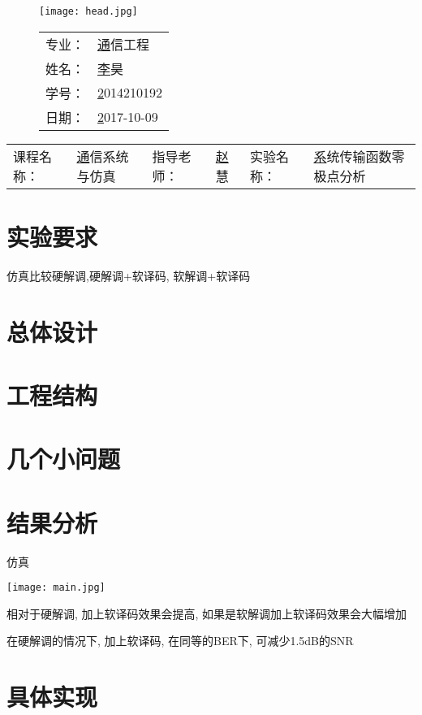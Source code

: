 \documentclass{zjureport}
\newcommand{\major}{通信工程}
\newcommand{\name}{李昊}
\newcommand{\stuid}{2014210192}
\newcommand{\newdate}{2017-10-09}
\newcommand{\course}{通信系统与仿真}
\newcommand{\tutor}{赵慧}
\newcommand{\newtitle}{系统传输函数零极点分析}
\begin{document}
\thispagestyle{empty}
\begin{figure}[h]
  \begin{minipage}{0.6\linewidth}
    \centerline{\texttt{[image: head.jpg]}}
  \end{minipage}
  \hfill
  \begin{minipage}{.4\linewidth}
    \raggedleft
    \begin{tabular*}{.8\linewidth}{ll}
      专业： & \underline\major   \\
      姓名： & \underline\name    \\
      学号： & \underline\stuid   \\
      日期： & \underline\newdate \\
    \end{tabular*}
  \end{minipage}
\end{figure}

\begin{table}[!htbp]
  \centering
  \begin{tabular*}{\linewidth}{llllll}
    课程名称： & \underline\course   & 指导老师： & \underline\tutor   & 实验名称：       &  \underline\newtitle\\
  \end{tabular*}
\end{table}


\section{实验要求}
	仿真比较硬解调,硬解调+软译码, 软解调+软译码
\section{总体设计}
	  

\section{工程结构}
    


\section{几个小问题}
    
\section{结果分析}
    \begin{clause}
	\item 仿真
      \begin{center}
        \texttt{[image: main.jpg]}
      \end{center}
	 \item 相对于硬解调, 加上软译码效果会提高, 如果是软解调加上软译码效果会大幅增加
	 \item 在硬解调的情况下, 加上软译码, 在同等的BER下, 可减少1.5dB的SNR
    \end{clause}
  	

\section{具体实现}
      
\end{document}
